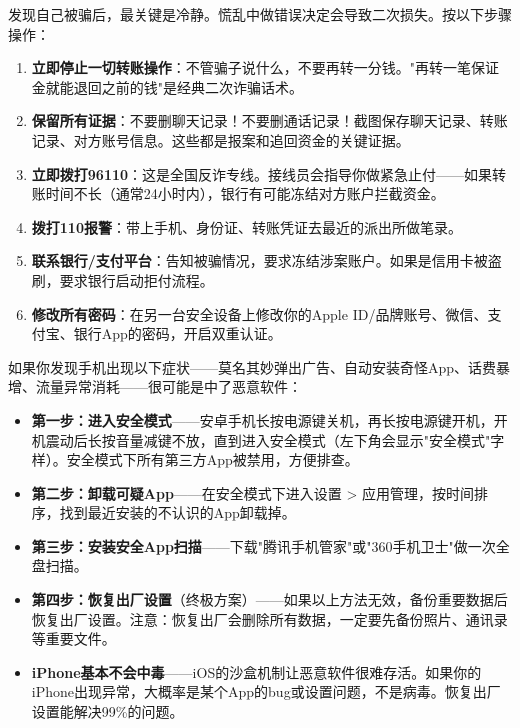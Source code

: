 
发现自己被骗后，最关键是冷静。慌乱中做错误决定会导致二次损失。按以下步骤操作：

\begin{enumerate}
  \item \textbf{立即停止一切转账操作}：不管骗子说什么，不要再转一分钱。"再转一笔保证金就能退回之前的钱"是经典二次诈骗话术。
  \item \textbf{保留所有证据}：不要删聊天记录！不要删通话记录！截图保存聊天记录、转账记录、对方账号信息。这些都是报案和追回资金的关键证据。
  \item \textbf{立即拨打96110}：这是全国反诈专线。接线员会指导你做紧急止付——如果转账时间不长（通常24小时内），银行有可能冻结对方账户拦截资金。
  \item \textbf{拨打110报警}：带上手机、身份证、转账凭证去最近的派出所做笔录。
  \item \textbf{联系银行/支付平台}：告知被骗情况，要求冻结涉案账户。如果是信用卡被盗刷，要求银行启动拒付流程。
  \item \textbf{修改所有密码}：在另一台安全设备上修改你的Apple ID/品牌账号、微信、支付宝、银行App的密码，开启双重认证。
\end{enumerate}


如果你发现手机出现以下症状——莫名其妙弹出广告、自动安装奇怪App、话费暴增、流量异常消耗——很可能是中了恶意软件：

\begin{itemize}
  \item \textbf{第一步：进入安全模式}——安卓手机长按电源键关机，再长按电源键开机，开机震动后长按音量减键不放，直到进入安全模式（左下角会显示"安全模式"字样）。安全模式下所有第三方App被禁用，方便排查。
  \item \textbf{第二步：卸载可疑App}——在安全模式下进入设置 > 应用管理，按时间排序，找到最近安装的不认识的App卸载掉。
  \item \textbf{第三步：安装安全App扫描}——下载"腾讯手机管家"或"360手机卫士"做一次全盘扫描。
  \item \textbf{第四步：恢复出厂设置}（终极方案）——如果以上方法无效，备份重要数据后恢复出厂设置。注意：恢复出厂会删除所有数据，一定要先备份照片、通讯录等重要文件。
  \item \textbf{iPhone基本不会中毒}——iOS的沙盒机制让恶意软件很难存活。如果你的iPhone出现异常，大概率是某个App的bug或设置问题，不是病毒。恢复出厂设置能解决99\%的问题。
\end{itemize}

